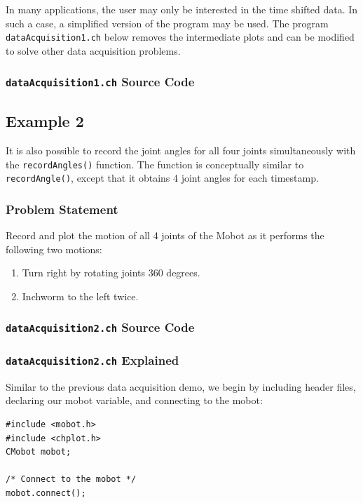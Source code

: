 \documentclass{article}
\begin{document}
In many applications, the user may only be interested in the time shifted data. 
In such a case, a simplified version of the program may be used. The program 
\texttt{dataAcquisition1.ch} below removes the intermediate plots and can be modified
to solve other data acquisition problems.

\subsubsection{\texttt{dataAcquisition1.ch} Source Code}


\subsection{Example 2}
It is also possible to record the joint angles for all four joints simultaneously
with the \texttt{recordAngles()} function. The function is conceptually similar
to \texttt{recordAngle()}, except that it obtains 4 joint angles for each timestamp.

\subsubsection{Problem Statement}
Record and plot the motion of all 4 joints of the Mobot as it performs the
following two motions:
\begin{enumerate}
\item Turn right by rotating joints 360 degrees.
\item Inchworm to the left twice.
\end{enumerate}

\subsubsection{\texttt{dataAcquisition2.ch} Source Code}


\subsubsection{\texttt{dataAcquisition2.ch} Explained}
Similar to the previous data acquisition demo, we begin by including
header files, declaring our mobot variable, and connecting to the mobot:
\begin{verbatim}
#include <mobot.h>
#include <chplot.h>
CMobot mobot;

/* Connect to the mobot */
mobot.connect();
\end{verbatim}
\end{document}
